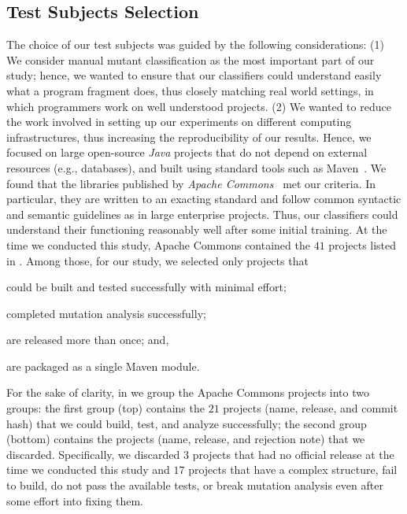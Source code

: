 \documentclass[sigconf]{acmart}
\begin{document}
\subsection{Test Subjects Selection}
\label{sec:selection}
The choice of our test subjects was guided by the following considerations:
(1) We consider manual mutant classification as the most important part of our study;
hence, we wanted to ensure that our classifiers could understand easily what a program
fragment does, thus closely matching real world settings, in which programmers
work on well understood projects.
(2) We wanted to reduce the work involved in setting up our experiments
on different computing infrastructures, thus %
increasing the reproducibility of our results. 
Hence, we focused on large open-source \emph{Java} projects that do
not depend on
external resources (e.g., databases), and built using standard tools such as Maven~\cite{maven}.
We found that the libraries published by \emph{Apache Commons}~\cite{commons} met our criteria.
In particular, they are written to an exacting standard and follow common syntactic
and semantic guidelines as in large enterprise projects. Thus, our classifiers
could understand their functioning %
reasonably well after some initial training.
At the time we conducted this study,
Apache Commons contained the $41$ projects listed in .
Among those, for our study, we selected only projects that
\begin{enumerate*}[label=(\arabic*)]
  \item could be built and tested successfully with minimal effort;
  \item completed mutation analysis successfully;
  \item are released more than once; and,
  \item are packaged as a single Maven module.
\end{enumerate*}

For the sake of clarity, in  we group the
Apache Commons projects into two groups:
the first group (top) contains the $21$ projects (name, release, and commit hash)
that we could build, test, and analyze successfully;
the second group (bottom) contains the projects (name, release, and rejection note) that we discarded.
Specifically, we discarded $3$ %
projects that had no official release at the time we conducted this study and 
$17$ projects that have a complex structure, fail to build, do not pass the available tests,
or break mutation analysis even after some effort into fixing them.%
\end{document}

